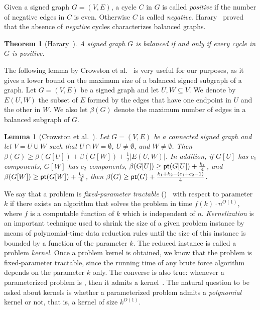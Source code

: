 \documentclass[
final
]{dmtcs-episciences}
\newtheorem{theorem}{Theorem}{\bfseries}{\itshape}
\newtheorem{lemma}{Lemma}{\bfseries}{\itshape}
\begin{document}
Given a signed graph $G=(V,E)$, a cycle $C$ in $G$ is called {\it{positive}} if the number of negative edges in $C$ is even. Otherwise $C$ is called {\it{negative}}.
Harary~\cite{harary1953}  proved that the absence of {\it{negative}} cycles characterizes balanced graphs.
	
\begin{theorem}[Harary~\cite{harary1953}]\label{theorem2.1}
A signed graph $G$ is balanced if and only if every cycle in $G$ is positive.	
\end{theorem}
	

The following lemma by Crowston et al.~\cite{crowston2013maximum} is very useful for our purposes, as it gives a lower bound on the maximum size of a balanced signed subgraph of a graph. Let $G=(V,E)$ be a signed graph and let $U, W\subseteq V$. We denote by $E(U,W)$ the subset of $E$ formed by the edges that have one endpoint in $U$ and the other in $W$. We also let  $\beta(G)$ denote the maximum number of edges in a balanced subgraph of $G$.

	\begin{lemma}[Crowston et al.~\cite{crowston2013maximum}]
 Let $G=(V,E)$ be a connected signed graph and let $V=U\cup W$ such that $U\cap W=\emptyset$, $U\neq \emptyset$, and $W\neq \emptyset$. Then $\beta(G)\geq \beta(G[U])+\beta(G[W])+\frac{1}{2}|E(U,W)|$. In addition, if $G[U]$ has $c_1$ components, $G[W]$ has $c_2$ components, $\beta(G[U])\geq {\sf pt}(G[U])+\frac{k_1}{4}$, and $\beta(G[W])\geq {\sf pt}(G[W])+\frac{k_2}{4}$, then $\beta(G)\geq {\sf pt}(G)+\frac{k_1+k_2-(c_1+c_2-1)}{4}$.  	 \label{beta}
	\end{lemma}
	


	We say that a problem is {\it{fixed-parameter tractable}} ({})~\cite{FG06,Nie06,DF13,CyganFKLMPPS15} with respect to parameter $k$
if there exists an algorithm that solves the problem  in time $f(k)\cdot n^{O(1)}$, where $f$ is a computable function of $k$ which is independent
of $n$.
{\it{Kernelization}} is an important
technique used to shrink the size of a given problem instance by means of
polynomial-time data reduction rules until the size of this instance is bounded by a function of
the parameter $k$. The reduced instance is called a problem {\it{kernel}}. Once a problem
kernel is obtained, we know that the problem is fixed-parameter tractable, since
the running time of any brute force algorithm depends on the parameter $k$ only.
The converse is also true: whenever a parameterized problem is {}, then it admits a kernel~\cite{FG06,Nie06,DF13,CyganFKLMPPS15}. The natural question to be asked about kernels is whether a parameterized problem admits a {\em polynomial} kernel or not, that is, a kernel of size $k^{O(1)}$.
\end{document}
